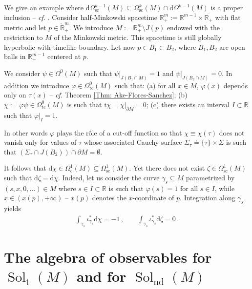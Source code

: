 \begin{Example}
	We give an example where $\mathrm{d}\Omega_{\mathrm{sc}}^{k-1}(M)\subseteq\Omega_{\mathrm{sc}}^k(M)\cap\mathrm{d}\Omega^{k-1}(M)$ is a proper inclusion -- \textit{cf.} \cite[Ex. 5.7]{Hack-Schenkel-13}.
	Consider half-Minkowski spacetime $\mathbb{R}^m_+:=\mathbb{R}^{m-1}\times\overline{\mathbb{R}_+}$ with flat metric and let $p\in\mathring{\mathbb{R}}^m_+$.
	We introduce $M:=\mathbb{R}^m_+\setminus J(p)$ endowed with the restriction to $M$ of the Minkowski metric. This spacetime is still globally hyperbolic with timelike boundary. Let now $p\in B_1\subset B_2$, where $B_1, B_2$ are open balls in $\mathbb{R}^{m-1}_+$ centered at $p$.
	
	We consider $\psi\in\Omega^0(M)$ such that $\psi|_{J(B_1\cap M)}=1$ and $\psi|_{J(B_2\cap M)}=0$.
	In addition we introduce $\varphi\in\Omega_{\mathrm{tc}}^0(M)$ such that: (a) for all $x\in M$, $\varphi(x)$ depends only on $\tau(x)$ -- \textit{cf}. Theorem \ref{Thm: Ake-Flores-Sanchez}; (b) $\chi:=\varphi\psi\in\Omega_{\mathrm{tc}}^0(M)$ is such that $\mathrm{t}\chi=\chi|_{\partial M}=0$; (c) there exists an interval $I\subset\mathbb{R}$ such that $\varphi|_I=1$.
	
	In other words $\varphi$ plays the r\^ole of a cut-off function so that $\chi\equiv\chi(\tau)$ does not vanish only for values of $\tau$ whose associated Cauchy surface $\Sigma_{\tau}\doteq\{\tau\}\times\Sigma$ is such that $(\Sigma_{\tau}\cap J(B_2))\cap\partial M=\emptyset$.
	
	It follows that $\mathrm{d}\chi\in\Omega_{\mathrm{c}}^1(M)\subseteq\Omega_{\mathrm{sc}}^1(M)$. Yet there does not exist $\zeta\in\Omega_{\mathrm{sc}}^1(M)$ such that $\mathrm{d}\zeta=\mathrm{d}\chi$.
	Indeed, let us consider the curve $\gamma_s\subseteq M$ parametrized by $(s,x,0,\ldots)\in M$ where $s\in I\subset\mathbb{R}$ is such that $\varphi(s)=1$ for all $s\in I$, while $x\in(x(p),+\infty)$ -- $x(p)$ denotes the $x$-coordinate of $p$.
	Integration along $\gamma_s$ yields
	\begin{align*}
	\int_{\gamma_s}\iota_{\gamma_s}^*\mathrm{d}\chi=-1\,,\qquad
	\int_{\gamma_s}\iota_{\gamma_s}^*\mathrm{d}\zeta=0\,.
	\end{align*}
\end{Example}



\section{The algebra of observables for $\operatorname{Sol}_{\mathrm{t}}(M)$ and for $\operatorname{Sol}_{\mathrm{nd}}(M)$}
\label{Sec: Algebra of observables for Sol(M)}


